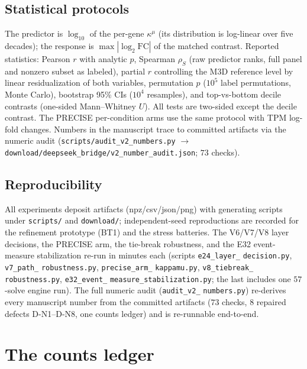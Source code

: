 \documentclass[11pt,a4paper]{article}
\theoremstyle{plain}
\theoremstyle{definition}
\theoremstyle{remark}
\newcommand{\kmu}{\kappa^{\mu}}
\begin{document}
\subsection{Statistical protocols}

The predictor is $\log_{10}$ of the per-gene $\kmu$ (its
distribution is log-linear over five decades); the response is
$\max|\log_2 \mathrm{FC}|$ of the matched contrast. Reported
statistics: Pearson $r$ with analytic $p$, Spearman $\rho_S$
(raw predictor ranks, full panel and nonzero subset as labeled),
partial $r$ controlling the M3D reference level by linear
residualization of both variables, permutation $p$ ($10^5$
label permutations, Monte Carlo), bootstrap 95\% CIs ($10^4$
resamples), and top-vs-bottom decile contrasts (one-sided
Mann--Whitney $U$). All tests are two-sided except the decile
contrast. The PRECISE per-condition arms use the same protocol
with TPM log-fold changes. Numbers in the manuscript trace to
committed artifacts via the numeric audit
(\texttt{scripts/audit\_v2\_numbers.py} $\to$
\texttt{download/deepseek\_bridge/v2\_number\_audit.json};
$73$ checks).

\subsection{Reproducibility}

All experiments deposit artifacts (npz/csv/json/png) with
generating scripts under \texttt{scripts/} and
\texttt{download/}; independent-seed reproductions are recorded
for the refinement prototype (BT1) and the stress batteries. The
V6/V7/V8 layer decisions, the PRECISE arm, the tie-break
robustness, and the E32 event-measure stabilization re-run in
minutes each (scripts
\texttt{e24\_layer\_} \texttt{decision.py},
\texttt{v7\_path\_} \texttt{robustness.py},
\texttt{precise\_arm\_} \texttt{kappamu.py},
\texttt{v8\_tiebreak\_} \texttt{robustness.py},
\texttt{e32\_event\_} \texttt{measure\_stabilization.py}; the last
includes one $57$-solve engine run). The full numeric audit
(\texttt{audit\_v2\_} \texttt{numbers.py}) re-derives every manuscript
number from the committed artifacts ($73$ checks, $8$ repaired
defects D-N1--D-N8, one counts ledger) and is re-runnable
end-to-end.

\appendix
\section{The counts ledger}\label{sec:counts}
\end{document}
